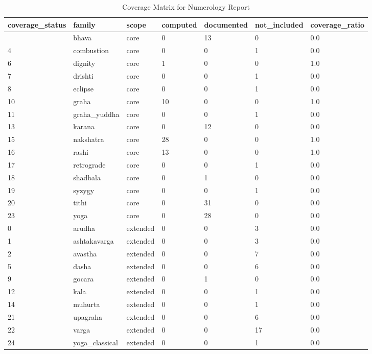 \documentclass[
  american,
  11pt,
  oneside,
  openany]{article}
\begin{document}
\begin{longtable}[]{@{}lllllll@{}}

\caption{\label{tbl-num-vedic-coverage}Coverage Matrix for Numerology
Report}

\tabularnewline

\toprule\noalign{}
coverage\_status & family & scope & computed & documented &
not\_included & coverage\_ratio \\
\midrule\noalign{}
\endhead
\bottomrule\noalign{}
\endlastfoot
3 & bhava & core & 0 & 13 & 0 & 0.0 \\
4 & combustion & core & 0 & 0 & 1 & 0.0 \\
6 & dignity & core & 1 & 0 & 0 & 1.0 \\
7 & drishti & core & 0 & 0 & 1 & 0.0 \\
8 & eclipse & core & 0 & 0 & 1 & 0.0 \\
10 & graha & core & 10 & 0 & 0 & 1.0 \\
11 & graha\_yuddha & core & 0 & 0 & 1 & 0.0 \\
13 & karana & core & 0 & 12 & 0 & 0.0 \\
15 & nakshatra & core & 28 & 0 & 0 & 1.0 \\
16 & rashi & core & 13 & 0 & 0 & 1.0 \\
17 & retrograde & core & 0 & 0 & 1 & 0.0 \\
18 & shadbala & core & 0 & 1 & 0 & 0.0 \\
19 & syzygy & core & 0 & 0 & 1 & 0.0 \\
20 & tithi & core & 0 & 31 & 0 & 0.0 \\
23 & yoga & core & 0 & 28 & 0 & 0.0 \\
0 & arudha & extended & 0 & 0 & 3 & 0.0 \\
1 & ashtakavarga & extended & 0 & 0 & 3 & 0.0 \\
2 & avastha & extended & 0 & 0 & 7 & 0.0 \\
5 & dasha & extended & 0 & 0 & 6 & 0.0 \\
9 & gocara & extended & 0 & 1 & 0 & 0.0 \\
12 & kala & extended & 0 & 0 & 1 & 0.0 \\
14 & muhurta & extended & 0 & 0 & 1 & 0.0 \\
21 & upagraha & extended & 0 & 0 & 6 & 0.0 \\
22 & varga & extended & 0 & 0 & 17 & 0.0 \\
24 & yoga\_classical & extended & 0 & 0 & 1 & 0.0 \\

\end{longtable}
\end{document}
